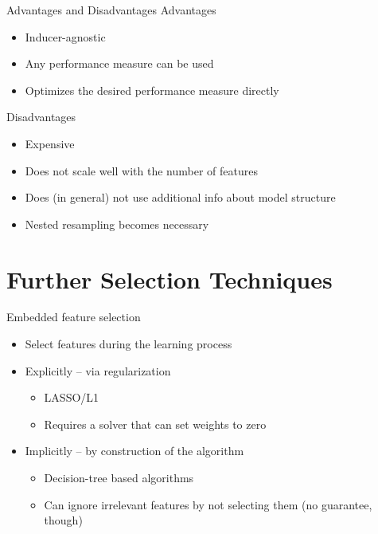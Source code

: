 \documentclass[11pt,compress,t,notes=noshow, aspectratio=169, xcolor=table]{beamer}
\begin{document}
\begin{frame}{Advantages and Disadvantages}
    Advantages
    \begin{itemize}
        \item Inducer-agnostic
        \item Any performance measure can be used
        \item Optimizes the desired performance measure directly
    \end{itemize}
    Disadvantages
    \begin{itemize}
        \item Expensive
        \item Does not scale well with the number of features
        \item Does (in general) not use additional info about model structure
        \item Nested resampling becomes necessary
    \end{itemize}
    
\end{frame}

\section{Further Selection Techniques}

\begin{frame}{Embedded feature selection}
    \begin{itemize}
        \item Select features during the learning process
        \item Explicitly -- via regularization
        \begin{itemize}
            \item LASSO/L1
            \item Requires a solver that can set weights to zero
        \end{itemize}
        \item Implicitly -- by construction of the algorithm
        \begin{itemize}
            \item Decision-tree based algorithms
            \item Can ignore irrelevant features by not selecting them (no guarantee, though)
        \end{itemize}
    \end{itemize}
\end{frame}
\end{document}

